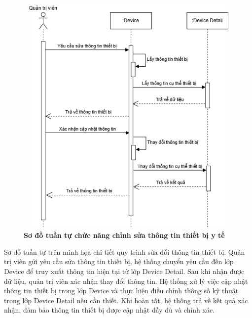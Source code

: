 \begin{figure}[H]
	\centering
	\includegraphics[width=12cm,height=12cm]{Images/sequence/device/update.drawio.png}
	\caption[Sơ đồ tuần tự chức năng chỉnh sửa thông tin thiết bị y tế]{\bfseries \fontsize{12pt}{0pt}
		\selectfont Sơ đồ tuần tự chức năng chỉnh sửa thông tin thiết bị y tế}
	\label{sequence_update_device} %
\end{figure}
Sơ đồ tuần tự trên minh họa chi tiết quy trình sửa đổi thông tin thiết bị. Quản trị viên gửi yêu cầu sửa thông tin thiết bị, hệ thống chuyển yêu cầu đến lớp Device để truy xuất thông tin hiện tại từ lớp Device Detail.
Sau khi nhận được dữ liệu, quản trị viên xác nhận thay đổi thông tin. Hệ thống xử lý việc cập nhật thông tin thiết bị trong lớp Device và thực hiện điều chỉnh thông số kỹ thuật trong lớp Device Detail nếu cần thiết.
Khi hoàn tất, hệ thống trả về kết quả xác nhận, đảm bảo thông tin thiết bị được cập nhật đầy đủ và chính xác.

